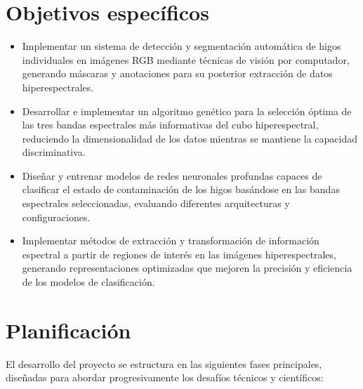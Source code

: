 \section{Objetivos específicos}
\begin{itemize}
    \item Implementar un sistema de detección y segmentación automática de higos individuales en imágenes RGB mediante técnicas de visión por computador, generando máscaras y anotaciones para su posterior extracción de datos hiperespectrales.
    \item Desarrollar e implementar un algoritmo genético para la selección óptima de las tres bandas espectrales más informativas del cubo hiperespectral, reduciendo la dimensionalidad de los datos mientras se mantiene la capacidad discriminativa.
    \item Diseñar y entrenar modelos de redes neuronales profundas capaces de clasificar el estado de contaminación de los higos basándose en las bandas espectrales seleccionadas, evaluando diferentes arquitecturas y configuraciones.
    \item Implementar métodos de extracción y transformación de información espectral a partir de regiones de interés en las imágenes hiperespectrales, generando representaciones optimizadas que mejoren la precisión y eficiencia de los modelos de clasificación.
\end{itemize}

\newpage
\section{Planificación}
El desarrollo del proyecto se estructura en las siguientes fases principales, diseñadas para abordar progresivamente los desafíos técnicos y científicos:

